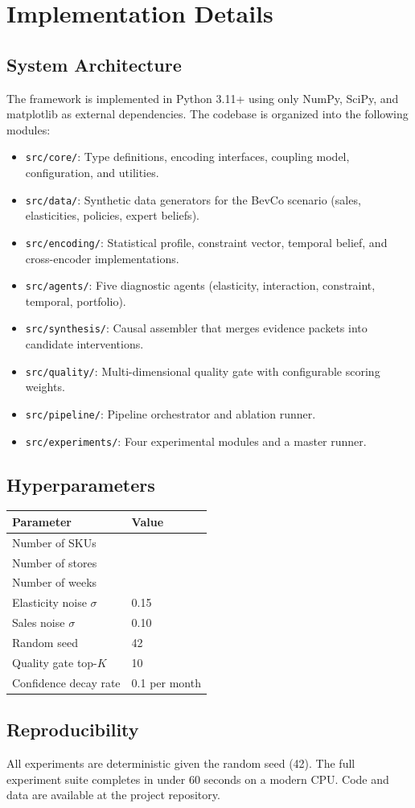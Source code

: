 \appendix
\section{Implementation Details}
\label{app:implementation}

\subsection{System Architecture}

The framework is implemented in Python 3.11+ using only NumPy, SciPy, and matplotlib as external dependencies.
The codebase is organized into the following modules:

\begin{itemize}
    \item \texttt{src/core/}: Type definitions, encoding interfaces, coupling model, configuration, and utilities.
    \item \texttt{src/data/}: Synthetic data generators for the BevCo scenario (sales, elasticities, policies, expert beliefs).
    \item \texttt{src/encoding/}: Statistical profile, constraint vector, temporal belief, and cross-encoder implementations.
    \item \texttt{src/agents/}: Five diagnostic agents (elasticity, interaction, constraint, temporal, portfolio).
    \item \texttt{src/synthesis/}: Causal assembler that merges evidence packets into candidate interventions.
    \item \texttt{src/quality/}: Multi-dimensional quality gate with configurable scoring weights.
    \item \texttt{src/pipeline/}: Pipeline orchestrator and ablation runner.
    \item \texttt{src/experiments/}: Four experimental modules and a master runner.
\end{itemize}

\subsection{Hyperparameters}

\begin{tabular}{ll}
\toprule
\textbf{Parameter} & \textbf{Value} \\
\midrule
Number of SKUs & \NSKUS{} \\
Number of stores & \NSTORES{} \\
Number of weeks & \NWEEKS{} \\
Elasticity noise $\sigma$ & 0.15 \\
Sales noise $\sigma$ & 0.10 \\
Random seed & 42 \\
Quality gate top-$K$ & 10 \\
Confidence decay rate & 0.1 per month \\
\bottomrule
\end{tabular}

\subsection{Reproducibility}

All experiments are deterministic given the random seed (42).
The full experiment suite completes in under 60 seconds on a modern CPU.
Code and data are available at the project repository.
